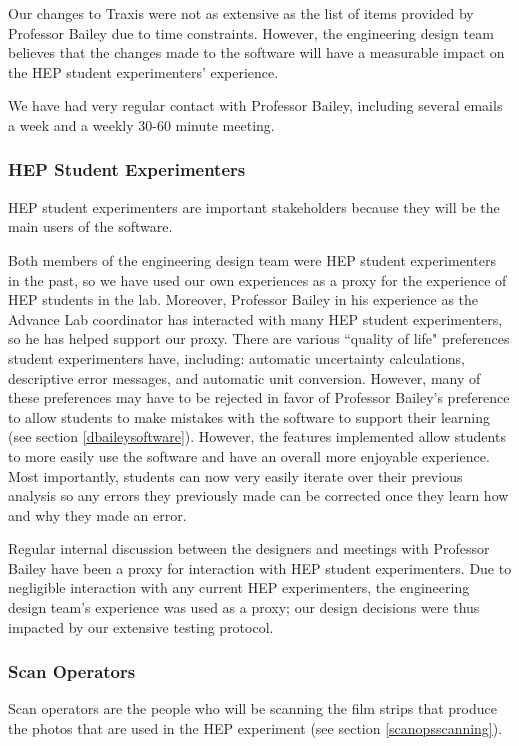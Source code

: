 \documentclass[12pt]{article} %
\begin{document}
Our changes to Traxis were not as extensive as the list of items provided by Professor Bailey due to time constraints. However, the engineering design team believes that the changes made to the software will have a measurable impact on the HEP student experimenters' experience. 

We have had very regular contact with Professor Bailey, including several emails a week and a weekly 30-60 minute meeting.

\subsubsection{HEP Student Experimenters}
HEP student experimenters are important stakeholders because they will be the main users of the software.

Both members of the engineering design team were HEP student experimenters in the past, so we have used our own experiences as a proxy for the experience of HEP students in the lab. Moreover, Professor Bailey in his experience as the Advance Lab coordinator has interacted with many HEP student experimenters, so he has helped support our proxy. There are various ``quality of life" preferences student experimenters have, including: automatic uncertainty calculations, descriptive error messages, and automatic unit conversion. However, many of these preferences may have to be rejected in favor of Professor Bailey's preference to allow students to make mistakes with the software to support their learning (see section \ref{dbaileysoftware}). However, the features implemented allow students to more easily use the software and have an overall more enjoyable experience. Most importantly, students can now very easily iterate over their previous analysis so any errors they previously made can be corrected once they learn how and why they made an error.

Regular internal discussion between the designers and meetings with Professor Bailey have been a proxy for interaction with HEP student experimenters. Due to negligible interaction with any current HEP experimenters, the engineering design team's experience was used as a proxy; our design decisions were thus impacted by our extensive testing protocol.

\subsubsection{Scan Operators} \label{scanopps software}
Scan operators are the people who will be scanning the film strips that produce the photos that are used in the HEP experiment (see section \ref{scanopsscanning}).
\end{document}
